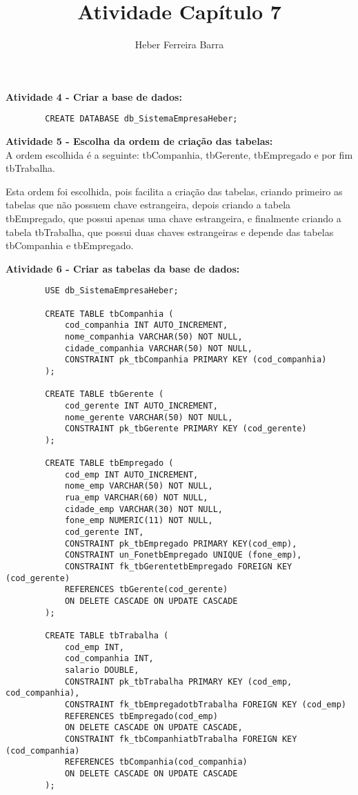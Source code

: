 \documentclass{article}
\author{Heber Ferreira Barra}
\title{Atividade Capítulo 7}
\begin{document}
	\maketitle	

	\textbf{Atividade 4 - Criar a base de dados:}
	\begin{verbatim}		
		CREATE DATABASE db_SistemaEmpresaHeber;
	\end{verbatim}

	\textbf{Atividade 5 - Escolha da ordem de criação das tabelas:}
	\\

	A ordem escolhida é a seguinte: tbCompanhia, tbGerente, tbEmpregado e por fim tbTrabalha.

	Esta ordem foi escolhida, pois facilita a criação das tabelas, criando primeiro as tabelas que não possuem chave estrangeira, depois criando a tabela tbEmpregado, que possui apenas uma chave estrangeira, e finalmente criando a tabela tbTrabalha, que possui duas chaves estrangeiras e depende das tabelas tbCompanhia e tbEmpregado.

	\pagebreak
	\textbf{Atividade 6 - Criar as tabelas da base de dados:}
	\begin{verbatim}		
		USE db_SistemaEmpresaHeber;

		CREATE TABLE tbCompanhia (
			cod_companhia INT AUTO_INCREMENT,
			nome_companhia VARCHAR(50) NOT NULL,
			cidade_companhia VARCHAR(50) NOT NULL,
			CONSTRAINT pk_tbCompanhia PRIMARY KEY (cod_companhia)
		);

		CREATE TABLE tbGerente (
			cod_gerente INT AUTO_INCREMENT,
			nome_gerente VARCHAR(50) NOT NULL,
			CONSTRAINT pk_tbGerente PRIMARY KEY (cod_gerente)
		);

		CREATE TABLE tbEmpregado (
			cod_emp INT AUTO_INCREMENT,
			nome_emp VARCHAR(50) NOT NULL,
			rua_emp VARCHAR(60) NOT NULL,
			cidade_emp VARCHAR(30) NOT NULL,
			fone_emp NUMERIC(11) NOT NULL,
			cod_gerente INT,
			CONSTRAINT pk_tbEmpregado PRIMARY KEY(cod_emp),
			CONSTRAINT un_FonetbEmpregado UNIQUE (fone_emp),
			CONSTRAINT fk_tbGerentetbEmpregado FOREIGN KEY (cod_gerente)
			REFERENCES tbGerente(cod_gerente)
			ON DELETE CASCADE ON UPDATE CASCADE
		);

		CREATE TABLE tbTrabalha (
			cod_emp INT,
			cod_companhia INT,
			salario DOUBLE,
			CONSTRAINT pk_tbTrabalha PRIMARY KEY (cod_emp, cod_companhia),
			CONSTRAINT fk_tbEmpregadotbTrabalha FOREIGN KEY (cod_emp)
			REFERENCES tbEmpregado(cod_emp)
			ON DELETE CASCADE ON UPDATE CASCADE,
			CONSTRAINT fk_tbCompanhiatbTrabalha FOREIGN KEY (cod_companhia)
			REFERENCES tbCompanhia(cod_companhia)
			ON DELETE CASCADE ON UPDATE CASCADE
		);
	\end{verbatim}
\end{document}

